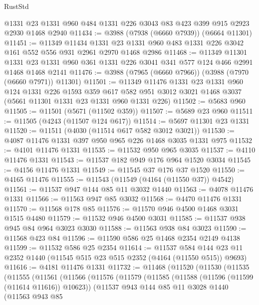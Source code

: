 \begin{lexlean}{RustStd}
\begin{coremodule}
    @1331
    @23
    @1331
    @960
    @484
    @1331
    @226
    @3043
    @83
    @423
    @399
    @915
    @2923
    @2930
    @1468
    @2940
@11434 := @3988 (@7938 (@6660 @7939)) (@6664 @11301)
@11451 := @11349
    @11434
    @1331
    @23
    @1331
    @960
    @483
    @1331
    @226
    @3042
    @161
    @552
    @556
    @931
    @2961
    @2970
    @1468
    @2986
@11468 := @11349
    @11301
    @1331
    @23
    @1331
    @960
    @361
    @1331
    @226
    @3041
    @341
    @577
    @124
    @466
    @2991
    @1468
    @1468
    @2141
@11476 := @3988 (@7965 (@6660 @7966)) (@3988 (@7970 (@6660 @7971)) @11301)
@11501 := @11349
    @11476
    @1331
    @23
    @1331
    @960
    @124
    @1331
    @226
    @1593
    @359
    @617
    @582
    @951
    @3012
    @3021
    @1468
    @3037
    (@5661 @11301 @1331 @23 @1331 @960 @1331 @226)
@11502 := @5683 @960
@11505 := @11501 (@5671 (@11502 @359))
@11507 := @5689 @23 @960
@11511 := @11505 (@4243 (@11507 @124 @617))
@11514 := @5697 @11301 @23 @1331
@11520 := @11511 (@4030 (@11514 @617 @582 @3012 @3021))
@11530 := @4087 @11476 @1331 @397 @950 @965 @226 @1468 @3035 @1331 @975
@11532 := @4101 @11476 @1331
@11535 := @11532 @950 @965 @3035
@11537 := @4110 @11476 @1331
@11543 := @11537 @182 @949 @176 @964 @1520 @3034
@11545 := @4156 @11476 @1331
@11549 := @11545 @37 @176 @37 @1520
@11550 := @4165 @11476
@11555 := @11543 (@11549 (@4164 (@11550 @37)) @4542)
@11561 := @11537 @947 @144 @85 @11 @3032 @1440
@11563 := @4078 @11476 @1331
@11566 := @11563 @947 @85 @3032
@11568 := @4470 @11476 @1331
@11570 := @11568 @178 @85
@11576 := @11570 @946 @4500 @1468 @3031 @1515 @4480
@11579 := @11532 @946 @4500 @3031
@11585 := @11537 @938 @945 @84 @964 @3023 @3030
@11588 := @11563 @938 @84 @3023
@11590 := @11568 @423 @84
@11596 := @11590 @586 @25 @1468 @2354 @2149 @4138
@11599 := @11532 @586 @25 @2354
@11614 := @11537
    @584
    @144
    @23
    @11
    @2352
    @1440
    (@11545 @515 @23 @515 @2352 (@4164 (@11550 @515)) @9693)
@11616 := @4181 @11476 @1331
@11732 := @11468
    (@11520
      (@11530
        (@11535
          (@11555
            (@11561
              (@11566
                (@11576
                  (@11579
                    (@11585
                      (@11588 (@11596 (@11599 (@11614 @11616)) @10623))
                      (@11537
                        @943
                        @144
                        @85
                        @11
                        @3028
                        @1440
                        (@11563
                          @943
                          @85

\end{coremodule}
\end{lexlean}
